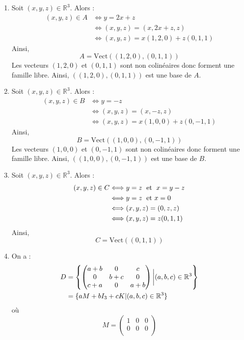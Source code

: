 \documentclass[a4paper,twoside,french,11pt]{VcCours}
\begin{document}
\begin{enumerate}
\item Soit $(x,y,z) \in \mathbb{R}^3$. Alors :
\begin{align*}
(x,y,z) \in A& \Longleftrightarrow y=2x+z \\
& \Longleftrightarrow (x,y,z)=(x,2x+z,z) \\
& \Longleftrightarrow (x,y,z) = x (1,2,0) + z(0,1,1)
\end{align*}
Ainsi,
$$ A = \textrm{Vect}((1,2,0),(0,1,1))$$
Les vecteurs $(1,2,0)$ et $(0,1,1)$ sont non colinéaires donc forment une famille libre. Ainsi, $((1,2,0),(0,1,1))$ est une base de $A$.

\item Soit $(x,y,z) \in \mathbb{R}^3$. Alors :
\begin{align*}
(x,y,z) \in B&\Longleftrightarrow y=-z \\
& \Longleftrightarrow (x,y,z)=(x,-z,z) \\
& \Longleftrightarrow (x,y,z) = x (1,0,0) + z (0,-1,1) 
\end{align*}
Ainsi,
$$ B = \textrm{Vect}((1,0,0),(0,-1,1))$$
Les vecteurs $(1,0,0)$ et $(0,-1,1)$ sont non colinéaires donc forment une famille libre. Ainsi, $((1,0,0),(0,-1,1))$ est une base de $B$.
\item Soit $(x,y,z) \in \mathbb{R}^3$. Alors :
\begin{align*}
(x,y,z) \in C&\Longleftrightarrow y=z \; \hbox{ et } \; x=y-z \\
& \Longleftrightarrow y=z \; \hbox{ et }  x=0 \\
& \Longleftrightarrow (x,y,z)= (0,z,z) \\
& \Longleftrightarrow (x,y,z)= z (0,1,1)
\end{align*}
Ainsi,
$$C = \textrm{Vect}((0,1,1))$$
\item On a :
\begin{align*}
D & = \left\lbrace \begin{pmatrix}
a+b & 0 & c \\
0 & b+c & 0 \\
c+a & 0& a+b 
\end{pmatrix} \bigg{\vert} (a,b,c) \in \mathbb{R}^3 \right\rbrace \\
& = \lbrace a M + b I_3 + c K \vert (a,b,c) \in \mathbb{R}^3 \rbrace 
\end{align*}
où 
$$ M = \begin{pmatrix}
1 & 0 & 0 \\
0 & 0 & 0 \\

\end{pmatrix}$$
\end{enumerate}
\end{document}
